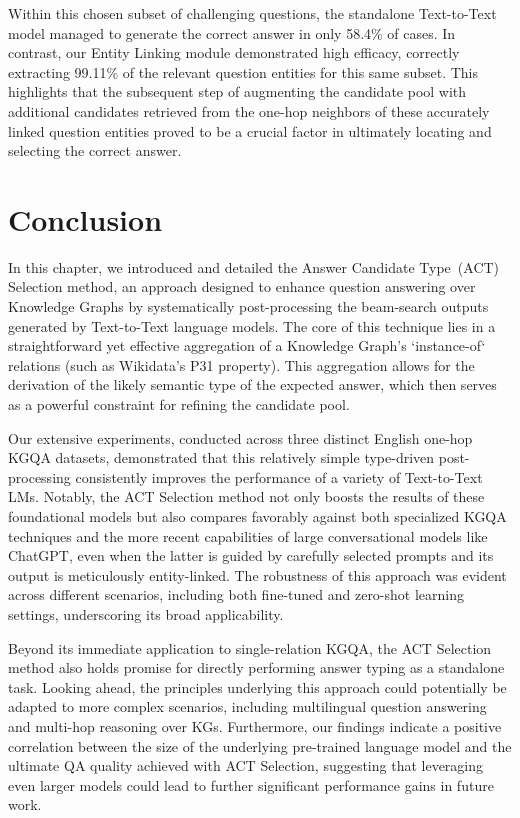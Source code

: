 Within this chosen subset of challenging questions, the standalone Text-to-Text model managed to generate the correct answer in only 58.4\% of cases. In contrast, our Entity Linking module demonstrated high efficacy, correctly extracting 99.11\% of the relevant question entities for this same subset. This highlights that the subsequent step of augmenting the candidate pool with additional candidates retrieved from the one-hop neighbors of these accurately linked question entities proved to be a crucial factor in ultimately locating and selecting the correct answer.


\section{Conclusion}
\label{sec:act_selection:conclusion}

In this chapter, we introduced and detailed the Answer Candidate Type~(ACT) Selection method, an approach designed to enhance question answering over Knowledge Graphs by systematically post-processing the beam-search outputs generated by Text-to-Text language models. The core of this technique lies in a straightforward yet effective aggregation of a Knowledge Graph's `instance-of` relations (such as Wikidata's P31 property). This aggregation allows for the derivation of the likely semantic type of the expected answer, which then serves as a powerful constraint for refining the candidate pool.

Our extensive experiments, conducted across three distinct English one-hop KGQA datasets, demonstrated that this relatively simple type-driven post-processing consistently improves the performance of a variety of Text-to-Text LMs. Notably, the ACT Selection method not only boosts the results of these foundational models but also compares favorably against both specialized KGQA techniques and the more recent capabilities of large conversational models like ChatGPT, even when the latter is guided by carefully selected prompts and its output is meticulously entity-linked. The robustness of this approach was evident across different scenarios, including both fine-tuned and zero-shot learning settings, underscoring its broad applicability.

Beyond its immediate application to single-relation KGQA, the ACT Selection method also holds promise for directly performing answer typing as a standalone task. Looking ahead, the principles underlying this approach could potentially be adapted to more complex scenarios, including multilingual question answering and multi-hop reasoning over KGs. Furthermore, our findings indicate a positive correlation between the size of the underlying pre-trained language model and the ultimate QA quality achieved with ACT Selection, suggesting that leveraging even larger models could lead to further significant performance gains in future work.


